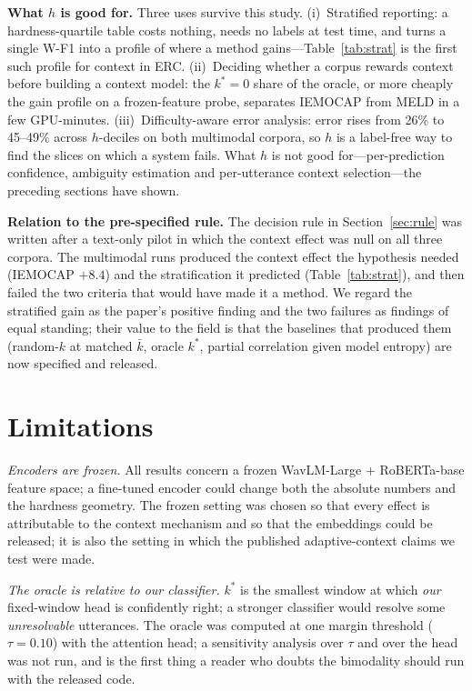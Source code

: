 \documentclass[journal]{IEEEtran}
\newcommand{\wf}{W-F1}
\newcommand{\kbar}{\bar{k}}
\begin{document}
\textbf{What $h$ is good for.} Three uses survive this study. (i)~Stratified reporting: a hardness-quartile table costs nothing, needs no labels at test time, and turns a single \wf{} into a profile of where a method gains---Table~\ref{tab:strat} is the first such profile for context in ERC. (ii)~Deciding whether a corpus rewards context before building a context model: the $k^*{=}0$ share of the oracle, or more cheaply the gain profile on a frozen-feature probe, separates IEMOCAP from MELD in a few GPU-minutes. (iii)~Difficulty-aware error analysis: error rises from 26\% to 45--49\% across $h$-deciles on both multimodal corpora, so $h$ is a label-free way to find the slices on which a system fails. What $h$ is not good for---per-prediction confidence, ambiguity estimation and per-utterance context selection---the preceding sections have shown.

\textbf{Relation to the pre-specified rule.} The decision rule in Section~\ref{sec:rule} was written after a text-only pilot in which the context effect was null on all three corpora. The multimodal runs produced the context effect the hypothesis needed (IEMOCAP $+8.4$) and the stratification it predicted (Table~\ref{tab:strat}), and then failed the two criteria that would have made it a method. We regard the stratified gain as the paper's positive finding and the two failures as findings of equal standing; their value to the field is that the baselines that produced them (random-$k$ at matched $\kbar$, oracle $k^*$, partial correlation given model entropy) are now specified and released.

\section{Limitations}\label{sec:limits}
\emph{Encoders are frozen.} All results concern a frozen WavLM-Large + RoBERTa-base feature space; a fine-tuned encoder could change both the absolute numbers and the hardness geometry. The frozen setting was chosen so that every effect is attributable to the context mechanism and so that the embeddings could be released; it is also the setting in which the published adaptive-context claims we test were made.

\emph{The oracle is relative to our classifier.} $k^*$ is the smallest window at which \emph{our} fixed-window head is confidently right; a stronger classifier would resolve some \emph{unresolvable} utterances. The oracle was computed at one margin threshold ($\tau = 0.10$) with the attention head; a sensitivity analysis over $\tau$ and over the head was not run, and is the first thing a reader who doubts the bimodality should run with the released code.
\end{document}

